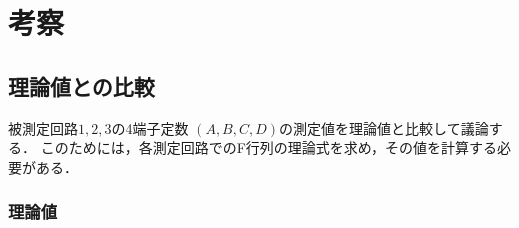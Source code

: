 
\section{考察}
\subsection{理論値との比較}
被測定回路$1,2,3$の4端子定数 $(A, B, C, D)$の測定値を理論値と比較して議論する．
このためには，各測定回路でのF行列の理論式を求め，その値を計算する必要がある．
\subsubsection{理論値}
